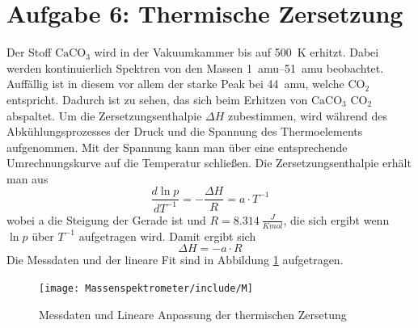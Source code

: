 \section{Aufgabe 6: Thermische Zersetzung}
Der Stoff $\text{CaCO}_3$ wird in der Vakuumkammer bis auf \SI{500}{K} erhitzt. Dabei werden kontinuierlich Spektren von den Massen \SIrange[]{1}{51}{amu} beobachtet. Auffällig ist in diesem vor allem der starke Peak bei \SI{44}{amu}, welche $\text{CO}_2$ entspricht. Dadurch ist zu sehen, das sich beim Erhitzen von $\text{CaCO}_3$ $\text{CO}_2$ abspaltet. Um die Zersetzungsenthalpie $\Delta H$ zubestimmen, wird während des Abkühlungsprozesses der Druck und die Spannung des Thermoelements aufgenommen. Mit der Spannung kann man über eine entsprechende Umrechnungskurve\cite{VorbereitungsMappe} auf die Temperatur schließen. 
Die Zersetzungsenthalpie erhält man aus $$\frac{d \ln{p}}{d T^{-1}} = -\frac{\Delta H}{R} = a\cdot T^{-1}$$ wobei a die Steigung der Gerade ist und $R = \SI{8.314}{\frac{J}{K mol}}$, die sich ergibt wenn $\ln{p}$ über $T^{-1}$ aufgetragen wird. Damit ergibt sich 
$$\Delta H = -a\cdot R$$
Die Messdaten und der lineare Fit sind in Abbildung \ref{} aufgetragen. 


\begin{figure}[H]
    \centering
    \texttt{[image: Massenspektrometer/include/M]}
    \caption{Messdaten und Lineare Anpassung der thermischen Zersetung}
    \label{fig:MSTherm}
\end{figure}